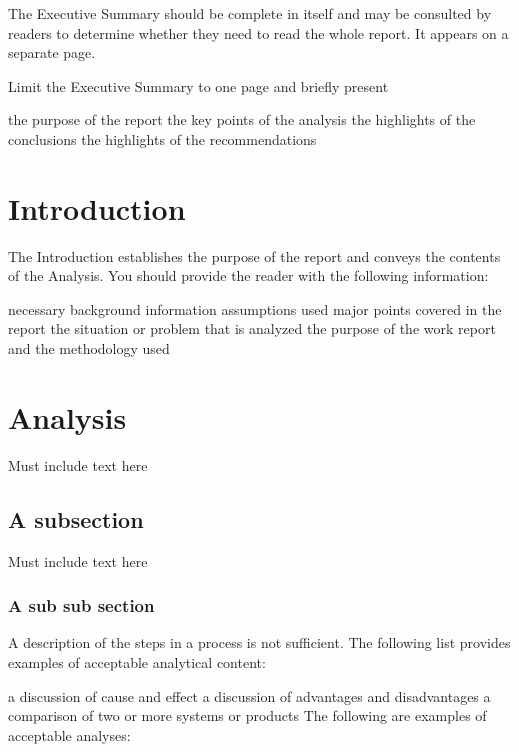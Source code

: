 \documentclass[12pt]{article}
\begin{document}
The Executive Summary should be complete in itself and may be consulted by readers to determine whether they need to read the whole report. It appears on a separate page.

Limit the Executive Summary to one page and briefly present

the purpose of the report
the key points of the analysis
the highlights of the conclusions
the highlights of the recommendations



\formattingForRestOfReport
\section{Introduction}



The Introduction establishes the purpose of the report and conveys the contents of the Analysis. You should provide the reader with the following information:

necessary background information
assumptions used
major points covered in the report
the situation or problem that is analyzed
the purpose of the work report and the methodology used


\section{Analysis} 


Must include text here
\subsection{A subsection}
Must include text here
\subsubsection{A sub sub section}

A description of the steps in a process is not sufficient. The following list provides examples of acceptable analytical content:

a discussion of cause and effect
a discussion of advantages and disadvantages
a comparison of two or more systems or products
The following are examples of acceptable analyses:
\end{document}
